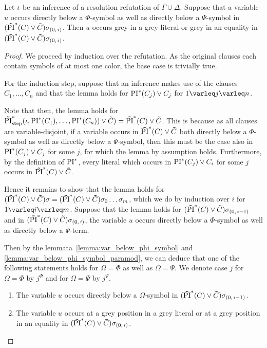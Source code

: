 \documentclass[%
	draft=false,%
	numbers=noendperiod,%
	11pt,%
	a4paper,%
	oneside,%
	openany,%
]{memoir}
\begin{document}
\begin{lemma}
	\label{lemma:col_change}
	Let $\iota$ be an inference of a resolution refutation of $\Gamma \cup \Delta$.
	Suppose that a variable $u$ occurs directly below a $\Phi$-symbol as well as directly below a $\Psi$-symbol in $(\bm\tilde{\operatorname{PI}}^{*}(C)\lor \bm\tilde{C})\sigma_{(0,\,i)}$.
	Then $u$ occurs grey in a grey literal or grey in an equality in $(\bm\tilde{\operatorname{PI}}^{*}(C)\lor \bm\tilde{C})\sigma_{(0,\,i)}$.
\end{lemma}
\begin{proof}
	We proceed by induction over the refutation.
	As the original clauses each contain symbols of at most one color, the base case is trivially true.

	For the induction step, suppose that an inference makes use of the clauses $C_1, \dots, C_n$ and that the lemma holds for $\operatorname{PI}^*(C_j) \lor C_j$ for $1\varleq j \varleq n$. 

	Note that then, the lemma holds for $\bm\tilde{\operatorname{PI}}^{*}_{\mathrm{step}}(\iota, \operatorname{PI}^*(C_1), \dots, \operatorname{PI}^*(C_n)) \lor \bm\tilde{C}) = \bm\tilde{\operatorname{PI}}^{*}(C)\lor \bm\tilde{C}$.
	This is because as all clauses are variable-disjoint, 
	if a variable occurs in $\bm\tilde{\operatorname{PI}}^{*}(C)\lor \bm\tilde{C}$ both directly below a $\Phi$-symbol as well as directly below a $\Psi$-symbol, then this must be the case also in 
	$\operatorname{PI}^*(C_j) \lor C_j$ for some $j$, for which the lemma by assumption holds.
	Furthermore, by the definition of $\operatorname{PI}^*$, every literal which occurs in $\operatorname{PI}^*(C_j) \lor C_i$ for some $j$ occurs in $\bm\tilde{\operatorname{PI}}^{*}(C)\lor \bm\tilde{C}$.

	Hence it remains to show that the lemma holds for $(\bm\tilde{\operatorname{PI}}^{*}(C)\lor \bm\tilde{C})\sigma = (\bm\tilde{\operatorname{PI}}^{*}(C)\lor \bm\tilde{C})\sigma_0\dots\sigma_m$, which we do by induction over $i$ for $1\varleq i \varleq m$.
	Suppose that the lemma holds for $(\bm\tilde{\operatorname{PI}}^{*}(C)\lor \bm\tilde{C})\sigma_{(0,\,i-1)}$ and in $(\bm\tilde{\operatorname{PI}}^{*}(C)\lor \bm\tilde{C})\sigma_{(0,\,i)}$, the variable $u$ occurs directly below a $\Phi$-symbol as well as directly below a $\Psi$-term.

	Then by the lemmata~\ref{lemma:var_below_phi_symbol} and \ref{lemma:var_below_phi_symbol_paramod}, we can deduce that one of the following statements holds for $\Omega = \Phi$ as well as $\Omega = \Psi$. We denote case $j$ for $\Omega = \Phi$ by $j^\Phi$ and for $\Omega = \Psi$ by $j^\Psi$.

	\begin{enumerate}
		\item
			\label{16_1}
			The variable $u$ occurs directly below a $\Omega$-symbol in $(\bm\tilde{\operatorname{PI}}^{*}(C)\lor \bm\tilde{C})\sigma_{(0,\,i-1)}$.

		\item
			\label{16_4}
			The variable $u$ occurs at a grey position in a grey literal or at a grey position in an equality in $(\bm\tilde{\operatorname{PI}}^{*}(C)\lor \bm\tilde{C})\sigma_{(0,\,i)}$.


\end{enumerate}
\end{proof}
\end{document}
